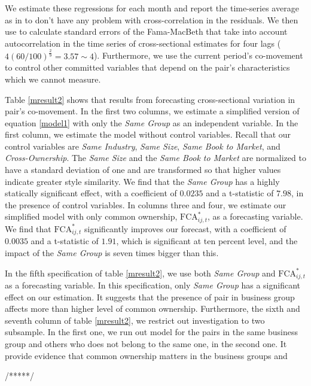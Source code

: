 \documentclass[12pt, a4paper]{article}
\begin{document}
We estimate these regressions for each month and report the time-series average as in \cite{FamaMacBeth} to don't have any problem with cross-correlation in the residuals. We then use  \cite{newey1987hypothesis} to calculate standard errors of the Fama-MacBeth that take into account autocorrelation in the time series of cross-sectional estimates for four lags ($ 4(60/100)^{\frac{2}{9}} = 3.57 \sim 4 $). Furthermore, we use the current period's co-movement to control other committed variables that depend on the pair's characteristics which we cannot measure. 

Table \ref{mresult2} shows that results from forecasting cross-sectional variation in pair's co-movement. In the first two columns, we estimate a simplified version of equation \ref{model1} with only the \textit{Same Group} as an independent variable. In the first column, we estimate the model without control variables. Recall that our control variables are \textit{Same Industry}, \textit{Same Size}, \textit{Same Book to Market}, and \textit{Cross-Ownership}. The \textit{Same Size} and the \textit{Same Book to Market} are normalized to have a standard deviation of one and are transformed so that higher values indicate greater style similarity. We find that the \textit{Same Group} has a highly statically significant effect, with a coefficient of $0.0235$ and a t-statistic of $7.98$, in the presence of control variables. 
In columns three and four, we estimate our simplified model with only common ownership, $\text{FCA}^*_{ij,t}$, as a forecasting variable. We find that $\text{FCA}^*_{ij,t}$ significantly improves our forecast, with a coefficient of $0.0035$ and a t-statistic of $1.91$, which is significant at ten percent level, and the impact of the \textit{Same Group} is seven times bigger than this. 

In the fifth specification of table \ref{mresult2}, we use both \textit{Same Group}  and $\text{FCA}^*_{ij,t}$ as a forecasting variable. In this specification, only  \textit{Same Group} has a significant effect on our estimation. It suggests that the presence of pair in business group affects more than higher level of common ownership.
 Furthermore, the sixth and seventh column of table \ref{mresult2}, we restrict out investigation to two subsample. In the first one, we run out model for the pairs in the same business group and others who does not belong to the same one, in the second one. It provide evidence that common ownership matters in the business groups and 
 
 /*****/
 
\end{document}

